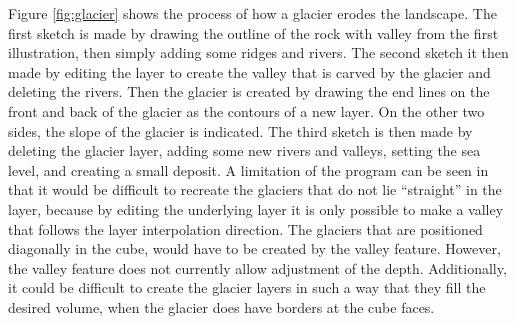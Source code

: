 \documentclass[a4paper,12pt]{report}
\begin{document}
Figure \ref{fig:glacier} shows the process of how a glacier erodes the landscape. The first sketch is made by drawing the outline of the rock with valley from the first illustration, then simply adding some ridges and rivers. The second sketch it then made by editing the layer to create the valley that is carved by the glacier and deleting the rivers. Then the glacier is created by drawing the end lines on the front and back of the glacier as the contours of a new layer. On the other two sides, the slope of the glacier is indicated. The third sketch is then made by deleting the glacier layer, adding some new rivers and valleys, setting the sea level, and creating a small deposit. A limitation of the program can be seen in that it would be difficult to recreate the glaciers that do not lie ``straight'' in the layer, because by editing the underlying layer it is only possible to make a valley that follows the layer interpolation direction. The glaciers that are positioned diagonally in the cube, would have to be created by the valley feature. However, the valley feature does not currently allow adjustment of the depth. Additionally, it could be difficult to create the glacier layers in such a way that they fill the desired volume, when the glacier does have borders at the cube faces.
\end{document}
